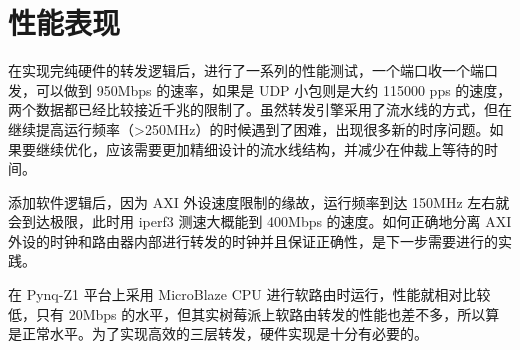 \documentclass{ctexart}
\begin{document}
\section{性能表现}
  在实现完纯硬件的转发逻辑后，进行了一系列的性能测试，一个端口收一个端口发，可以做到 950Mbps 的速率，如果是 UDP 小包则是大约 115000 pps 的速度，两个数据都已经比较接近千兆的限制了。虽然转发引擎采用了流水线的方式，但在继续提高运行频率（>250MHz）的时候遇到了困难，出现很多新的时序问题。如果要继续优化，应该需要更加精细设计的流水线结构，并减少在仲裁上等待的时间。

  添加软件逻辑后，因为 AXI 外设速度限制的缘故，运行频率到达 150MHz 左右就会到达极限，此时用 iperf3 测速大概能到 400Mbps 的速度。如何正确地分离 AXI 外设的时钟和路由器内部进行转发的时钟并且保证正确性，是下一步需要进行的实践。

  在 Pynq-Z1 平台上采用 MicroBlaze CPU 进行软路由时运行，性能就相对比较低，只有 20Mbps 的水平，但其实树莓派上软路由转发的性能也差不多，所以算是正常水平。为了实现高效的三层转发，硬件实现是十分有必要的。
\end{document}
